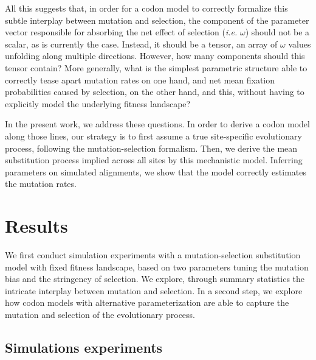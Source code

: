 All this suggests that, in order for a codon model to correctly formalize this subtle interplay between mutation and selection, the component of the parameter vector responsible for absorbing the net effect of selection (\textit{i.e.} $\omega$) should not be a scalar, as is currently the case.
Instead, it should be a tensor, an array of $\omega$ values unfolding along multiple directions.
However, how many components should this tensor contain?
More generally, what is the simplest parametric structure able to correctly tease apart mutation rates on one hand, and net mean fixation probabilities caused by selection, on the other hand, and this, without having to explicitly model the underlying fitness landscape?

In the present work, we address these questions.
In order to derive a codon model along those lines, our strategy is to first assume a true site-specific evolutionary process, following the mutation-selection formalism.
Then, we derive the mean substitution process implied across all sites by this mechanistic model.
Inferring parameters on simulated alignments, we show that the model correctly estimates the mutation rates.


\section{Results}

We first conduct simulation experiments with a mutation-selection substitution model with fixed fitness landscape, based on two parameters tuning the mutation bias and the stringency of selection.
We explore, through summary statistics the intricate interplay between mutation and selection.
In a second step, we explore how codon models with alternative parameterization are able to capture the mutation and selection of the evolutionary process.

\subsection{Simulations experiments}

